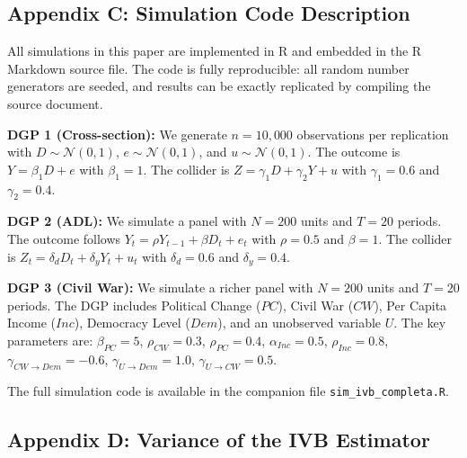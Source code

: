 \documentclass[
]{article}
\begin{document}
\subsection{\texorpdfstring{Appendix C: Simulation Code Description
\label{app:code}}{Appendix C: Simulation Code Description }}\label{appendix-c-simulation-code-description}

All simulations in this paper are implemented in R and embedded in the R
Markdown source file. The code is fully reproducible: all random number
generators are seeded, and results can be exactly replicated by
compiling the source document.

\textbf{DGP 1 (Cross-section):} We generate \(n = 10{,}000\)
observations per replication with \(D \sim \mathcal{N}(0,1)\),
\(e \sim \mathcal{N}(0,1)\), and \(u \sim \mathcal{N}(0,1)\). The
outcome is \(Y = \beta_1 D + e\) with \(\beta_1 = 1\). The collider is
\(Z = \gamma_1 D + \gamma_2 Y + u\) with \(\gamma_1 = 0.6\) and
\(\gamma_2 = 0.4\).

\textbf{DGP 2 (ADL):} We simulate a panel with \(N = 200\) units and
\(T = 20\) periods. The outcome follows
\(Y_t = \rho Y_{t-1} + \beta D_t + e_t\) with \(\rho = 0.5\) and
\(\beta = 1\). The collider is
\(Z_t = \delta_d D_t + \delta_y Y_t + u_t\) with \(\delta_d = 0.6\) and
\(\delta_y = 0.4\).

\textbf{DGP 3 (Civil War):} We simulate a richer panel with \(N = 200\)
units and \(T = 20\) periods. The DGP includes Political Change
(\(PC\)), Civil War (\(CW\)), Per Capita Income (\(Inc\)), Democracy
Level (\(Dem\)), and an unobserved variable \(U\). The key parameters
are: \(\beta_{PC} = 5\), \(\rho_{CW} = 0.3\), \(\rho_{PC} = 0.4\),
\(\alpha_{Inc} = 0.5\), \(\rho_{Inc} = 0.8\),
\(\gamma_{CW \to Dem} = -0.6\), \(\gamma_{U \to Dem} = 1.0\),
\(\gamma_{U \to CW} = 0.5\).

The full simulation code is available in the companion file
\texttt{sim\_ivb\_completa.R}.

\subsection{\texorpdfstring{Appendix D: Variance of the IVB Estimator
\label{app:variance}}{Appendix D: Variance of the IVB Estimator }}\label{appendix-d-variance-of-the-ivb-estimator}
\end{document}
